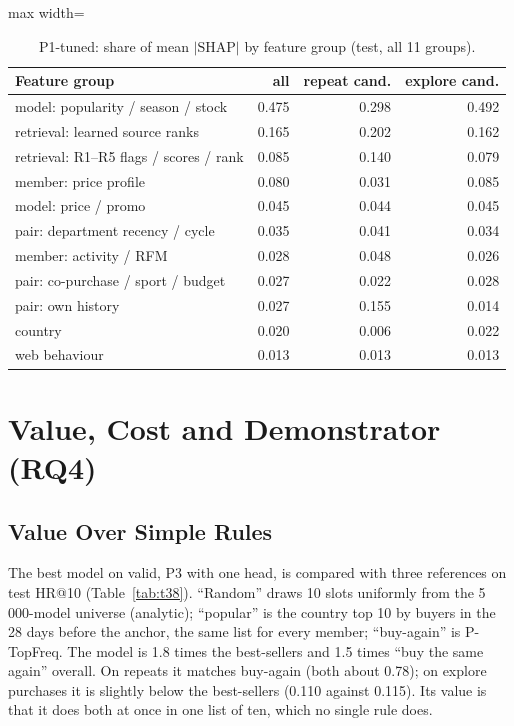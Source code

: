 \documentclass{ieeeaccess}
\begin{document}
\begin{table}[t]
\caption{P1-tuned: share of mean $|\mathrm{SHAP}|$ by feature group (test, all 11 groups).}
\label{tab:shap}
\setlength{\tabcolsep}{3pt}
\centering
\begin{adjustbox}{max width=\columnwidth}
\begin{tabular}{lrrr}
\toprule
Feature group & all & repeat cand. & explore cand. \\
\midrule
model: popularity / season / stock      & 0.475 & 0.298 & 0.492 \\
retrieval: learned source ranks         & 0.165 & 0.202 & 0.162 \\
retrieval: R1--R5 flags / scores / rank & 0.085 & 0.140 & 0.079 \\
member: price profile                   & 0.080 & 0.031 & 0.085 \\
model: price / promo                    & 0.045 & 0.044 & 0.045 \\
pair: department recency / cycle        & 0.035 & 0.041 & 0.034 \\
member: activity / RFM                  & 0.028 & 0.048 & 0.026 \\
pair: co-purchase / sport / budget      & 0.027 & 0.022 & 0.028 \\
pair: own history                       & 0.027 & 0.155 & 0.014 \\
country                                 & 0.020 & 0.006 & 0.022 \\
web behaviour                           & 0.013 & 0.013 & 0.013 \\
\bottomrule
\end{tabular}
\end{adjustbox}
\end{table}

\section{Value, Cost and Demonstrator (RQ4)}
\label{sec:feasibility}

\subsection{Value Over Simple Rules}
The best model on valid, P3 with one head, is compared with three references on test HR@10 (Table~\ref{tab:t38}). ``Random'' draws
10 slots uniformly from the 5\,000-model universe (analytic); ``popular'' is the country top 10 by buyers in the 28 days before the
anchor, the same list for every member; ``buy-again'' is P-TopFreq. The model is 1.8 times the best-sellers and 1.5 times ``buy the
same again'' overall. On repeats it matches buy-again (both about 0.78); on explore purchases it is slightly below the best-sellers
(0.110 against 0.115). Its value is that it does both at once in one list of ten, which no single rule does.
\end{document}

